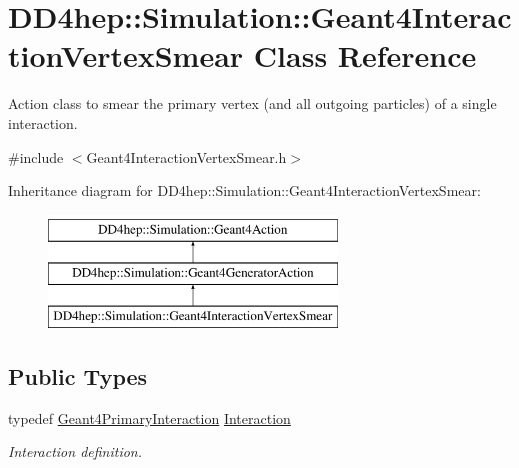 \hypertarget{class_d_d4hep_1_1_simulation_1_1_geant4_interaction_vertex_smear}{}\section{D\+D4hep\+:\+:Simulation\+:\+:Geant4\+Interaction\+Vertex\+Smear Class Reference}
\label{class_d_d4hep_1_1_simulation_1_1_geant4_interaction_vertex_smear}


Action class to smear the primary vertex (and all outgoing particles) of a single interaction.  




{\ttfamily \#include $<$Geant4\+Interaction\+Vertex\+Smear.\+h$>$}

Inheritance diagram for D\+D4hep\+:\+:Simulation\+:\+:Geant4\+Interaction\+Vertex\+Smear\+:\begin{figure}[H]
\begin{center}
\leavevmode
\includegraphics[height=3.000000cm]{class_d_d4hep_1_1_simulation_1_1_geant4_interaction_vertex_smear}
\end{center}
\end{figure}
\subsection*{Public Types}
\begin{DoxyCompactItemize}
\item 
typedef \hyperlink{class_d_d4hep_1_1_simulation_1_1_geant4_primary_interaction}{Geant4\+Primary\+Interaction} \hyperlink{class_d_d4hep_1_1_simulation_1_1_geant4_interaction_vertex_smear_ab70397967639759170996f67855a8c74}{Interaction}
\begin{DoxyCompactList}\small\item\em Interaction definition. \end{DoxyCompactList}\end{DoxyCompactItemize}
